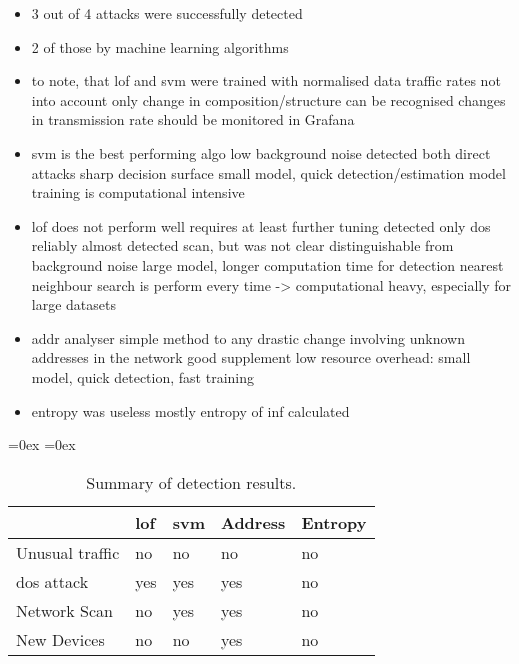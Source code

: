 \begin{itemize}
	\item 3 out of 4 attacks were successfully detected
	\item 2 of those by machine learning algorithms
	\item to note, that lof and svm were trained with normalised data
		\subitem traffic rates not into account
		\subitem only change in composition/structure can be recognised
		\subitem changes in transmission rate should be monitored in Grafana
		
	\item \gls{svm} is the best performing algo
		\subitem low background noise
		\subitem detected both direct attacks
		\subitem sharp decision surface
		\subitem small model, quick detection/estimation
		\subitem model training is computational intensive
				
	\item \gls{lof} does not perform well
		\subitem requires at least further tuning
		\subitem detected only \gls{dos} reliably
		\subitem almost detected scan, but was not clear distinguishable from background noise
		\subitem large model, longer computation time for detection
		\subitem nearest neighbour search is perform every time -> computational heavy, especially for large datasets
		
	\item addr analyser
		\subitem simple method to any drastic change involving unknown addresses in the network
		\subitem good supplement
		\subitem low resource overhead: small model, quick detection, fast training
	
	\item entropy was useless
		\subitem mostly entropy of inf calculated
		
\end{itemize}

\begin{table}[H]
	\aboverulesep=0ex
	\belowrulesep=0ex
	\renewcommand{\arraystretch}{1.2}
	
	\centering
	\begin{tabularx}{0.95\textwidth}{|l|Y|Y|Y|Y|}
		\toprule
		& \gls{lof} & \gls{svm} & Address & Entropy \\\midrule
		Unusual traffic & no & no & no & no \\\midrule
		\gls{dos} attack & yes & yes & yes & no \\\midrule
		Network Scan & no & yes & yes & no \\\midrule
		New Devices & no & no & yes & no \\\midrule
	\end{tabularx}
	\caption[Summary of detection results]{Summary of detection results.}
	\label{tab:results:conclusion}
\end{table}

